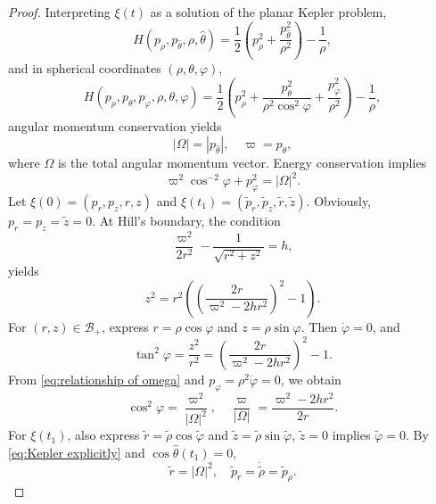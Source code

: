 \documentclass[11pt]{amsart}
\newcommand{\om}{\varpi}
\begin{document}
\begin{proof}
	Interpreting $\xi(t)$ as a solution of the planar Kepler problem,  
	\begin{equation}
		H(p_{\rho}, p_{\hat{\theta}}, \rho, \hat{\theta}) = \frac{1}{2} \left( p_{\rho}^2 + \frac{p_{\hat{\theta}}^2}{\rho^2} \right) - \frac{1}{\rho}, \label{eq:energy 1}
	\end{equation}
	and in spherical coordinates $(\rho, \theta, \varphi)$,  
	\begin{equation}
		H(p_{\rho}, p_{\theta}, p_{\varphi}, \rho, \theta, \varphi) = \frac{1}{2} \left( p_{\rho}^2 + \frac{p_{\theta}^2}{\rho^2 \cos^2 \varphi} + \frac{p_{\varphi}^2}{\rho^2} \right) - \frac{1}{\rho}, \label{eq:energy 2}
	\end{equation}
	angular momentum conservation yields  
	\begin{equation}
		|\Omega| = |p_{\hat{\theta}}|, \quad \om = p_{\theta}, \label{eq:angular momentum conservation}
	\end{equation}
	where $\Omega$ is the total angular momentum vector. Energy conservation implies  
	\begin{equation}
		\om^2 \cos^{-2}\varphi + p_{\varphi}^2 = |\Omega|^2. \label{eq:relationship of omega}
	\end{equation}
	Let $\xi(0) = (p_r, p_z, r, z)$ and $\xi(t_1) = (\tilde{p}_r, \tilde{p}_z, \tilde{r}, \tilde{z})$. Obviously, $p_r=p_z=\tilde{z}=0$. At Hill’s boundary, the condition  
	$$
	\frac{\om^2}{2r^2} - \frac{1}{\sqrt{r^2 + z^2}} = h,  
	$$  
	yields  
	$$
	z^2 = r^2 \left( \left( \frac{2r}{\om^2 - 2hr^2} \right)^2 - 1 \right).  
	$$  
	For $(r, z) \in \mathcal{B}_{+}$, express $r = \rho \cos\varphi$ and $z = \rho \sin\varphi$. Then $\dot{\varphi} = 0$, and  
	$$
	\tan^2\varphi = \frac{z^2}{r^2} = \left( \frac{2r}{\om^2 - 2hr^2} \right)^2 - 1.  
	$$  
	From \eqref{eq:relationship of omega} and $p_{\varphi} = \rho^2 \dot{\varphi} = 0$, we obtain  
	\begin{equation}
		\cos^2\varphi = \frac{\om^2}{|\Omega|^2}, \quad \frac{\om}{|\Omega|} = \frac{\om^2 - 2hr^2}{2r}. \label{eq:omega ratio}
	\end{equation}
	For $\xi(t_1)$, also express $\tilde{r} = \tilde{\rho} \cos\tilde{\varphi}$ and $\tilde{z} = \tilde{\rho} \sin\tilde{\varphi}$, $\tilde{z} = 0$ implies $\tilde{\varphi} = 0$. By \eqref{eq:Kepler explicitly} and $\cos\hat{\theta}(t_1) = 0$,  
	\begin{equation}
			\tilde{r} = |\Omega|^2, \quad \tilde{p}_r = \dot{\tilde{\rho}} = \tilde{p}_\rho. \label{eq:tilde relations}

\end{equation}
\end{proof}
\end{document}
